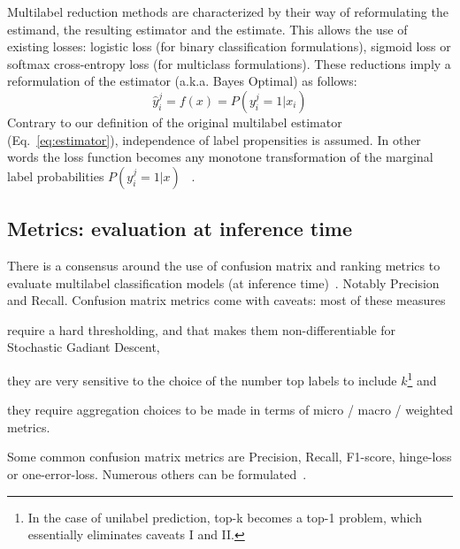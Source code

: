 \vspace{\baselineskip}

Multilabel reduction methods are characterized by their way of reformulating the estimand, the resulting estimator and the estimate. This allows the use of existing losses: logistic loss (for binary classification formulations), sigmoid loss or softmax cross-entropy loss (for multiclass formulations). These reductions imply a reformulation of the estimator (a.k.a. Bayes Optimal) as follows:
%
\begin{equation}
  \hat{y}_i^j = f(x) = P(y_i^j = 1 | x_i)
\end{equation}
%
Contrary to our definition of the original multilabel estimator (Eq.~\ref{eq:estimator}), independence of label propensities is assumed. In other words the loss function becomes any monotone transformation of the marginal label probabilities $P(y_i^j = 1 | x)$ ~\cite{OVA2, multilabelMetrics, unifiedView}.


\subsection{Metrics: evaluation at inference time}
\label{section:background:metrics}

There is a consensus around the use of confusion matrix  and ranking metrics to evaluate multilabel classification models (at inference time)~\cite{multilabelMetrics, weightedMetrics, unifiedView}. Notably Precision and Recall. Confusion matrix metrics come with caveats: most of these measures 
\begin{enumerate*}
\item require a hard thresholding, and that makes them non-differentiable for Stochastic Gadiant Descent, 
\item they are very sensitive to the choice of the number top labels to include $k$\footnote{In the case of unilabel prediction, top-k becomes a top-1 problem, which essentially eliminates caveats I and II.} and 
\item they require aggregation choices to be made in terms of micro / macro / weighted metrics.
\end{enumerate*}
Some common confusion matrix metrics are Precision, Recall, F1-score, hinge-loss or one-error-loss. Numerous others can be formulated~\cite{unifiedView}.


